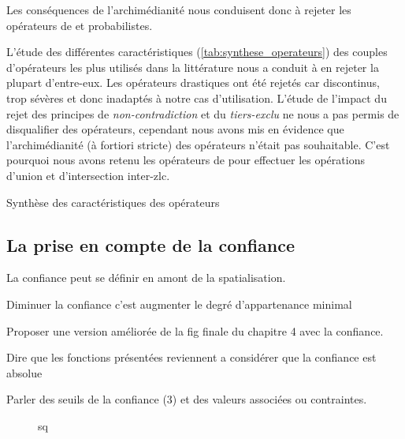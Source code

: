 Les conséquences de l'archimédianité nous conduisent donc à rejeter
les opérateurs de  et probabilistes. 


L'étude des différentes caractéristiques
(\autoref{tab:synthese_operateurs}) des couples d'opérateurs les plus
utilisés dans la littérature nous a conduit à en rejeter la plupart
d'entre-eux. Les opérateurs drastiques ont été rejetés car
discontinus, trop sévères et donc inadaptés à notre cas
d'utilisation. L'étude de l'impact du rejet des principes de
\emph{non-contradiction} et du \emph{tiers-exclu} ne nous a pas permis
de disqualifier des opérateurs, cependant nous avons mis en évidence
que l'archimédianité (à fortiori stricte) des opérateurs n'était pas
souhaitable. C'est pourquoi nous avons retenu les opérateurs de
\textcite{Zadeh1965} pour effectuer les opérations d'union et
d'intersection inter-\ac{zlc}.


\begin{table}
  \centering
  
  \caption{Synthèse des caractéristiques des opérateurs}
  \label{tab:synthese_operateurs}
\end{table}



\subsection{La prise en compte de la confiance}

La confiance peut se définir en amont de la spatialisation.

Diminuer la confiance c'est augmenter le degré d'appartenance minimal

Proposer une version améliorée de la fig finale du chapitre 4 avec la
confiance.

Dire que les fonctions présentées reviennent a considérer que la
confiance est absolue

Parler des seuils de la confiance (3) et des valeurs associées ou
contraintes.


\begin{figure}
  \centering
  
  \caption{sq}
  \label{fig:qs}
\end{figure}




\begin{figure}
  \centering
\end{figure}




